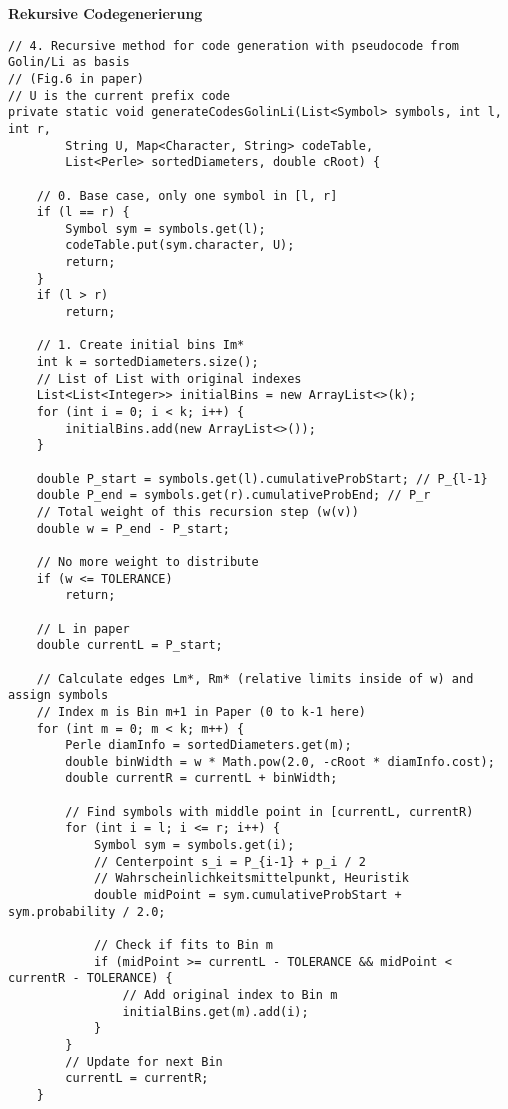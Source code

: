 \documentclass[a4paper,10pt,ngerman]{scrartcl}
\begin{document}
\textbf{Rekursive Codegenerierung}
\begin{lstlisting}
// 4. Recursive method for code generation with pseudocode from Golin/Li as basis
// (Fig.6 in paper)
// U is the current prefix code
private static void generateCodesGolinLi(List<Symbol> symbols, int l, int r,
        String U, Map<Character, String> codeTable,
        List<Perle> sortedDiameters, double cRoot) {

    // 0. Base case, only one symbol in [l, r]
    if (l == r) {
        Symbol sym = symbols.get(l);
        codeTable.put(sym.character, U);
        return;
    }
    if (l > r)
        return;

    // 1. Create initial bins Im*
    int k = sortedDiameters.size();
    // List of List with original indexes
    List<List<Integer>> initialBins = new ArrayList<>(k);
    for (int i = 0; i < k; i++) {
        initialBins.add(new ArrayList<>());
    }

    double P_start = symbols.get(l).cumulativeProbStart; // P_{l-1}
    double P_end = symbols.get(r).cumulativeProbEnd; // P_r
    // Total weight of this recursion step (w(v))
    double w = P_end - P_start;

    // No more weight to distribute
    if (w <= TOLERANCE)
        return;

    // L in paper
    double currentL = P_start;

    // Calculate edges Lm*, Rm* (relative limits inside of w) and assign symbols
    // Index m is Bin m+1 in Paper (0 to k-1 here)
    for (int m = 0; m < k; m++) {
        Perle diamInfo = sortedDiameters.get(m);
        double binWidth = w * Math.pow(2.0, -cRoot * diamInfo.cost);
        double currentR = currentL + binWidth;

        // Find symbols with middle point in [currentL, currentR)
        for (int i = l; i <= r; i++) {
            Symbol sym = symbols.get(i);
            // Centerpoint s_i = P_{i-1} + p_i / 2
            // Wahrscheinlichkeitsmittelpunkt, Heuristik
            double midPoint = sym.cumulativeProbStart + sym.probability / 2.0;

            // Check if fits to Bin m
            if (midPoint >= currentL - TOLERANCE && midPoint < currentR - TOLERANCE) {
                // Add original index to Bin m
                initialBins.get(m).add(i);
            }
        }
        // Update for next Bin
        currentL = currentR;
    }


\end{lstlisting}
\end{document}
